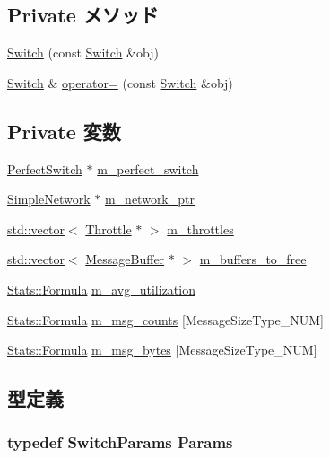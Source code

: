 \subsection*{Private メソッド}
\begin{DoxyCompactItemize}
\item 
\hyperlink{classSwitch_a2c5113fd7347a61a5dcbdae8c7222338}{Switch} (const \hyperlink{classSwitch}{Switch} \&obj)
\item 
\hyperlink{classSwitch}{Switch} \& \hyperlink{classSwitch_a91e7e0dd3e09defd46617999ca7293dc}{operator=} (const \hyperlink{classSwitch}{Switch} \&obj)
\end{DoxyCompactItemize}
\subsection*{Private 変数}
\begin{DoxyCompactItemize}
\item 
\hyperlink{classPerfectSwitch}{PerfectSwitch} $\ast$ \hyperlink{classSwitch_a1e62591a6bf9b516ffb6d140c3c75e14}{m\_\-perfect\_\-switch}
\item 
\hyperlink{classSimpleNetwork}{SimpleNetwork} $\ast$ \hyperlink{classSwitch_a512555c08578dfab6c301b43cc2b0f1b}{m\_\-network\_\-ptr}
\item 
\hyperlink{classstd_1_1vector}{std::vector}$<$ \hyperlink{classThrottle}{Throttle} $\ast$ $>$ \hyperlink{classSwitch_a764f898917b49de64070c3ff93124b66}{m\_\-throttles}
\item 
\hyperlink{classstd_1_1vector}{std::vector}$<$ \hyperlink{classMessageBuffer}{MessageBuffer} $\ast$ $>$ \hyperlink{classSwitch_aeb4204d50ceb840342cc89cd607e8fa9}{m\_\-buffers\_\-to\_\-free}
\item 
\hyperlink{classStats_1_1Formula}{Stats::Formula} \hyperlink{classSwitch_a7e9e107598908b59fea0fa4cd82ab84c}{m\_\-avg\_\-utilization}
\item 
\hyperlink{classStats_1_1Formula}{Stats::Formula} \hyperlink{classSwitch_aab66b83ab5d0c228e10abb19ddbc78f2}{m\_\-msg\_\-counts} \mbox{[}MessageSizeType\_\-NUM\mbox{]}
\item 
\hyperlink{classStats_1_1Formula}{Stats::Formula} \hyperlink{classSwitch_a88ad01e3ba9f7c20e95be6554a9badd6}{m\_\-msg\_\-bytes} \mbox{[}MessageSizeType\_\-NUM\mbox{]}
\end{DoxyCompactItemize}


\subsection{型定義}
\hypertarget{classSwitch_a07c03790510d4a31198bb5deef53da38}{
\subsubsection[{Params}]{\setlength{\rightskip}{0pt plus 5cm}typedef SwitchParams {\bf Params}}}
\label{classSwitch_a07c03790510d4a31198bb5deef53da38}


